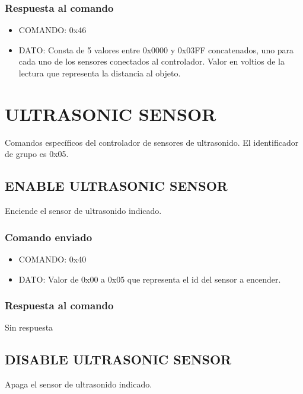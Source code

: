 \documentclass[a4paper,10pt]{article}
\begin{document}
\subsubsection*{Respuesta al comando}

\begin{itemize}
	\item{COMANDO:} 0x46
	\item{DATO:} Consta de 5 valores entre 0x0000 y 0x03FF concatenados, uno para cada uno de los sensores conectados al controlador.
	Valor en voltios de la lectura que representa la distancia al objeto.
\end{itemize}

\section{ULTRASONIC SENSOR} 
\label{grupo_ultrasonic_sensor}

Comandos espec\'ificos del controlador de sensores de ultrasonido.
El identificador de grupo es 0x05.

\subsection{ENABLE ULTRASONIC SENSOR}
\label{enable_ultrasonic_sensor}

Enciende el sensor de ultrasonido indicado.

\subsubsection*{Comando enviado}

\begin{itemize}
	\item{COMANDO:} 0x40
	\item{DATO:} Valor de 0x00 a 0x05 que representa el id del sensor a encender.
\end{itemize}

\subsubsection*{Respuesta al comando}

Sin respuesta

\subsection{DISABLE ULTRASONIC SENSOR}
\label{disable_ultrasonic_sensor}

Apaga el sensor de ultrasonido indicado.
\end{document}
